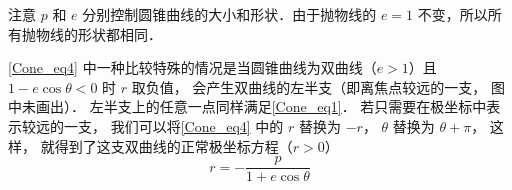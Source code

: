 注意 $p$ 和 $e$ 分别控制圆锥曲线的大小和形状．由于抛物线的 $e = 1$ 不变，所以所有抛物线的形状都相同．

\autoref{Cone_eq4} 中一种比较特殊的情况是当圆锥曲线为双曲线（$e > 1$）且 $1- e\cos\theta < 0$ 时 $r$ 取负值， 会产生双曲线的左半支（即离焦点较远的一支， 图中未画出）． 左半支上的任意一点同样满足\autoref{Cone_eq1}． 若只需要在极坐标中表示较远的一支， 我们可以将\autoref{Cone_eq4} 中的 $r$ 替换为 $-r$， $\theta$ 替换为 $\theta + \pi$， 这样， 就得到了这支双曲线的正常极坐标方程（$r > 0$）
\begin{equation}\label{Cone_eq6}
r = -\frac{p}{1 + e\cos\theta}
\end{equation}



